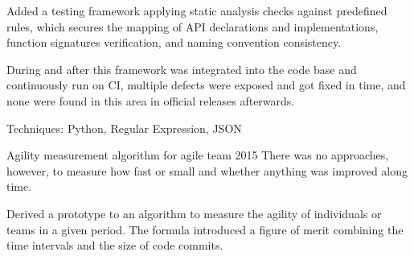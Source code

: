 \begin{cventries}
    {
      \begin{cvitems}
        \item {Added a testing framework applying static analysis checks against predefined rules, which secures the mapping of API declarations and implementations, function signatures verification, and naming convention consistency.}
        \item{During and after this framework was integrated into the code base and continuously run on CI, multiple defects were exposed and got fixed in time, and none were found in this area in official releases afterwards.}
        \item{Techniques: Python, Regular Expression, JSON}
      \end{cvitems}
    }
  \cventryX
    {Agility measurement algorithm for agile team}
    {2015}
    {There was no approaches, however, to measure how fast or small and whether anything was improved along time.}
    {
      \begin{cvitems}
        \item {Derived a prototype to an algorithm to measure the agility of individuals or teams in a given period. The formula introduced a figure of merit combining the time intervals and the size of code commits.}
      \end{cvitems}
    }
\end{cventries}

